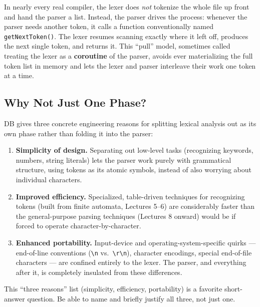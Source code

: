 \documentclass[11pt]{article}
\begin{document}
\begin{coreidea}
In nearly every real compiler, the lexer does \emph{not} tokenize the whole file up front and
hand the parser a list. Instead, the parser drives the process: whenever the parser needs another
token, it calls a function conventionally named \texttt{getNextToken()}. The lexer resumes
scanning exactly where it left off, produces the next single token, and returns it. This
``pull'' model, sometimes called treating the lexer as a \textbf{coroutine} of the parser, avoids
ever materializing the full token list in memory and lets the lexer and parser interleave their
work one token at a time.
\end{coreidea}

\subsection{Why Not Just One Phase?}

\dbtag DB gives three concrete engineering reasons for splitting lexical analysis out as its own
phase rather than folding it into the parser:

\begin{enumerate}
  \item \textbf{Simplicity of design.} Separating out low-level tasks (recognizing keywords,
  numbers, string literals) lets the parser work purely with grammatical structure, using
  tokens as its atomic symbols, instead of also worrying about individual characters.
  \item \textbf{Improved efficiency.} Specialized, table-driven techniques for recognizing
  tokens (built from finite automata, Lectures 5--6) are considerably faster than the
  general-purpose parsing techniques (Lectures 8 onward) would be if forced to operate
  character-by-character.
  \item \textbf{Enhanced portability.} Input-device and operating-system-specific quirks ---
  end-of-line conventions (\texttt{\textbackslash n} vs.\ \texttt{\textbackslash r\textbackslash n}), character
  encodings, special end-of-file characters --- are confined entirely to the lexer. The parser,
  and everything after it, is completely insulated from these differences.
\end{enumerate}

\begin{examfocus}
This ``three reasons'' list (simplicity, efficiency, portability) is a favorite short-answer
question. Be able to name and briefly justify all three, not just one.
\end{examfocus}
\end{document}
